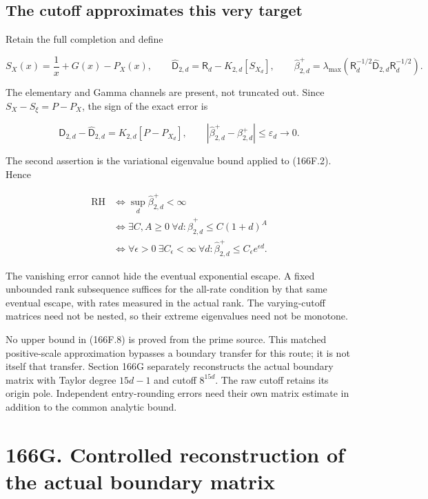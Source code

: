 \documentclass[
  11pt,
]{book}
\begin{document}
\subsection{The cutoff approximates this very
target}\label{the-cutoff-approximates-this-very-target}

Retain the full completion and define

\[
S_X(x)=\frac1x+G(x)-P_X(x),\qquad
\widehat{\mathsf D}_{2,d}=\mathsf R_d-K_{2,d}[S_{X_d}],\qquad
\widehat\beta_{2,d}^+=
\lambda_{\max}(\mathsf R_d^{-1/2}\widehat{\mathsf D}_{2,d}\mathsf R_d^{-1/2}).
\tag{166F.6}
\]

The elementary and Gamma channels are present, not truncated out. Since
\(S_X-S_\xi=P-P_X\), the sign of the exact error is

\[
\mathsf D_{2,d}-\widehat{\mathsf D}_{2,d}=K_{2,d}[P-P_{X_d}],\qquad
|\widehat\beta_{2,d}^+-\beta_{2,d}^+|\le\varepsilon_d\longrightarrow0.
\tag{166F.7}
\]

The second assertion is the variational eigenvalue bound applied to
(166F.2). Hence

\[
\boxed{\begin{aligned}
\mathrm{RH}&\iff\sup_d\widehat\beta_{2,d}^+<\infty\\
&\iff\exists C,A\ge0\ \forall d:
 \widehat\beta_{2,d}^+\le C(1+d)^A\\
&\iff\forall\epsilon>0\ \exists C_\epsilon<\infty\ \forall d:
 \widehat\beta_{2,d}^+\le C_\epsilon e^{\epsilon d}.
\end{aligned}}
\tag{166F.8}
\]

The vanishing error cannot hide the eventual exponential escape. A fixed
unbounded rank subsequence suffices for the all-rate condition by that
same eventual escape, with rates measured in the actual rank. The
varying-cutoff matrices need not be nested, so their extreme eigenvalues
need not be monotone.

No upper bound in (166F.8) is proved from the prime source. This matched
positive-scale approximation bypasses a boundary transfer for this
route; it is not itself that transfer. Section 166G separately
reconstructs the actual boundary matrix with Taylor degree \(15d-1\) and
cutoff \(8^{15d}\). The raw cutoff retains its origin pole. Independent
entry-rounding errors need their own matrix estimate in addition to the
common analytic bound.

\section{166G. Controlled reconstruction of the actual boundary
matrix}\label{g.-controlled-reconstruction-of-the-actual-boundary-matrix}
\end{document}
